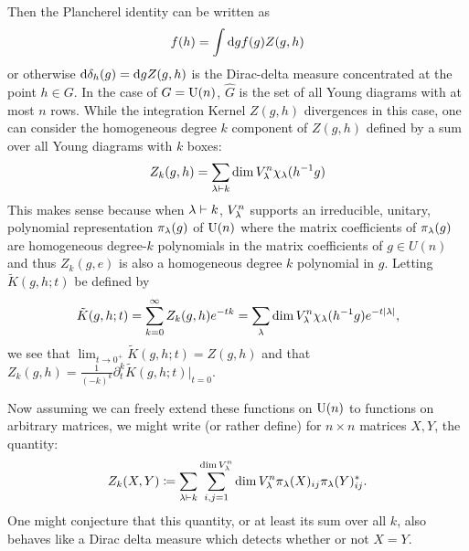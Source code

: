 \documentclass[notitlepage, 10pt]{article}
\begin{document}
    Then the Plancherel identity can be written as
    \begin{equation}
        f(h) = \int \mathrm{d} g f(g) Z(g,h)
    \end{equation}
    or otherwise $\mathrm{d} \delta_h(g) = \mathrm{d} g Z(g,h)$ is the Dirac-delta measure concentrated at the point $h \in G$.
    In the case of $G = \operatorname{U}(n)$, $\hat G$ is the set of all Young diagrams with at most $n$ rows.
    While the integration Kernel $Z(g,h)$ divergences in this case, one can consider the homogeneous degree $k$ component of $Z(g,h)$ defined by a sum over all Young diagrams with $k$ boxes:
    \begin{equation}
        Z_k(g,h) = \sum_{\lambda \vdash k} \dim V_{\lambda}^{n} \chi_{\lambda}(h^{-1}g) 
    \end{equation}
    This makes sense because when $\lambda \vdash k$, $V_{\lambda}^{n}$ supports an irreducible, unitary, polynomial representation $\pi_{\lambda}(g)$ of $\operatorname{U}(n)$ where the matrix coefficients of $\pi_{\lambda}(g)$ are homogeneous degree-$k$ polynomials in the matrix coefficients of $g \in U(n)$ and thus $Z_k(g,e)$ is also a homogeneous degree $k$ polynomial in $g$.
    Letting $\tilde K(g,h;t)$ be defined by
    \begin{equation}
        \tilde K(g,h;t) = \sum_{k=0}^{\infty} Z_{k}(g,h) e^{-tk} = \sum_{\lambda}\dim V_{\lambda}^{n} \chi_{\lambda}(h^{-1}g) e^{-t {|\lambda|}},
    \end{equation}
    we see that $\lim_{t\to 0^{+}}\tilde K(g,h;t) = Z(g,h)$ and that $Z_{k}(g,h) = \frac{1}{(-k)^{k}}\partial_{t}^{k} \tilde K(g,h;t) |_{t = 0}$.
     
    Now assuming we can freely extend these functions on $\operatorname{U}(n)$ to functions on arbitrary matrices, we might write (or rather define) for $n\times n$ matrices $X,Y$, the quantity:
    \begin{equation}
        Z_k(X,Y) \coloneqq \sum_{\lambda \vdash k} \sum_{i,j=1}^{\dim V_{\lambda}^{n}} \dim V_{\lambda}^{n} \pi_{\lambda}(X)_{ij} \pi_{\lambda}(Y)_{ij}^{*}.
    \end{equation}
    One might conjecture that this quantity, or at least its sum over all $k$, also behaves like a Dirac delta measure which detects whether or not $X = Y$.
\end{document}
